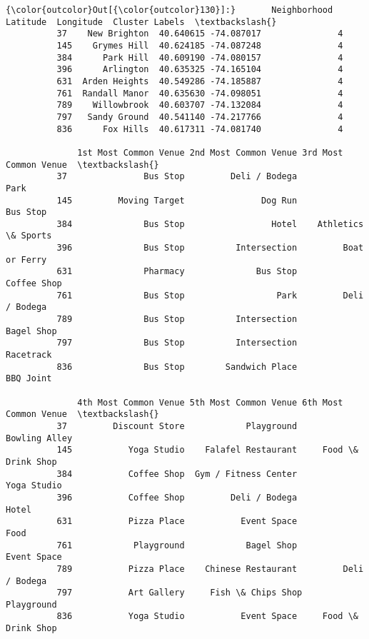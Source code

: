 \documentclass[11pt]{article}
\begin{document}
\begin{Verbatim}[commandchars=\\\{\}]
{\color{outcolor}Out[{\color{outcolor}130}]:}       Neighborhood   Latitude  Longitude  Cluster Labels  \textbackslash{}
          37    New Brighton  40.640615 -74.087017               4   
          145    Grymes Hill  40.624185 -74.087248               4   
          384      Park Hill  40.609190 -74.080157               4   
          396      Arlington  40.635325 -74.165104               4   
          631  Arden Heights  40.549286 -74.185887               4   
          761  Randall Manor  40.635630 -74.098051               4   
          789    Willowbrook  40.603707 -74.132084               4   
          797   Sandy Ground  40.541140 -74.217766               4   
          836      Fox Hills  40.617311 -74.081740               4   
          
              1st Most Common Venue 2nd Most Common Venue 3rd Most Common Venue  \textbackslash{}
          37               Bus Stop         Deli / Bodega                  Park   
          145         Moving Target               Dog Run              Bus Stop   
          384              Bus Stop                 Hotel    Athletics \& Sports   
          396              Bus Stop          Intersection         Boat or Ferry   
          631              Pharmacy              Bus Stop           Coffee Shop   
          761              Bus Stop                  Park         Deli / Bodega   
          789              Bus Stop          Intersection            Bagel Shop   
          797              Bus Stop          Intersection             Racetrack   
          836              Bus Stop        Sandwich Place             BBQ Joint   
          
              4th Most Common Venue 5th Most Common Venue 6th Most Common Venue  \textbackslash{}
          37         Discount Store            Playground         Bowling Alley   
          145           Yoga Studio    Falafel Restaurant     Food \& Drink Shop   
          384           Coffee Shop  Gym / Fitness Center           Yoga Studio   
          396           Coffee Shop         Deli / Bodega                 Hotel   
          631           Pizza Place           Event Space                  Food   
          761            Playground            Bagel Shop           Event Space   
          789           Pizza Place    Chinese Restaurant         Deli / Bodega   
          797           Art Gallery     Fish \& Chips Shop            Playground   
          836           Yoga Studio           Event Space     Food \& Drink Shop   
          

\end{Verbatim}
\end{document}

